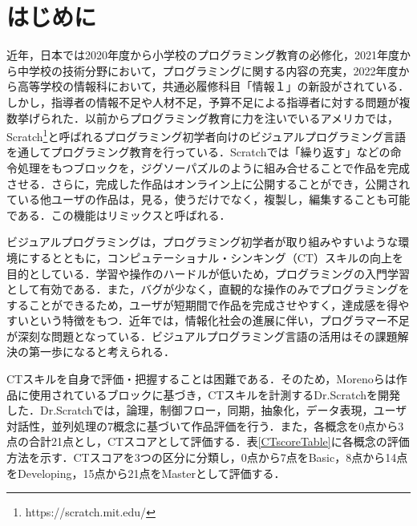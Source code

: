 \documentclass[submit,techrep,noauthor]{ipsj}
\begin{document}
\section{はじめに}

近年，日本では2020年度から小学校のプログラミング教育の必修化，2021年度から中学校の技術分野において，プログラミングに関する内容の充実，2022年度から高等学校の情報科において，共通必履修科目「情報１」の新設がされている\cite{monkashou}．しかし，指導者の情報不足や人材不足，予算不足による指導者に対する問題が複数挙げられた\cite{monkashou2}．以前からプログラミング教育に力を注いでいるアメリカでは，Scratch\footnote{https://scratch.mit.edu/}\cite{resnick2009scratch}と呼ばれるプログラミング初学者向けのビジュアルプログラミング言語を通してプログラミング教育を行っている．Scratchでは「繰り返す」などの命令処理をもつブロックを，ジグソーパズルのように組み合せることで作品を完成させる．さらに，完成した作品はオンライン上に公開することができ，公開されている他ユーザの作品は，見る，使うだけでなく，複製し，編集することも可能である．この機能はリミックスと呼ばれる．

ビジュアルプログラミングは，プログラミング初学者が取り組みやすいような環境にするとともに，コンピュテーショナル・シンキング（CT）\cite{wing2006computational}スキルの向上を目的としている．学習や操作のハードルが低いため，プログラミングの入門学習として有効である．また，バグが少なく，直観的な操作のみでプログラミングをすることができるため，ユーザが短期間で作品を完成させやすく，達成感を得やすいという特徴をもつ．近年では，情報化社会の進展に伴い，プログラマー不足が深刻な問題となっている．ビジュアルプログラミング言語の活用はその課題解決の第一歩になると考えられる．

CTスキルを自身で評価・把握することは困難である．そのため，Morenoらは作品に使用されているブロックに基づき，CTスキルを計測するDr.Scratch\cite{moreno2015dr}を開発した．Dr.Scratchでは，論理，制御フロー，同期，抽象化，データ表現，ユーザ対話性，並列処理の7概念に基づいて作品評価を行う．また，各概念を0点から3点の合計21点とし，CTスコアとして評価する．表\ref{CTscoreTable}に各概念の評価方法を示す．CTスコアを3つの区分に分類し，0点から7点をBasic，8点から14点をDeveloping，15点から21点をMasterとして評価する．
\end{document}
